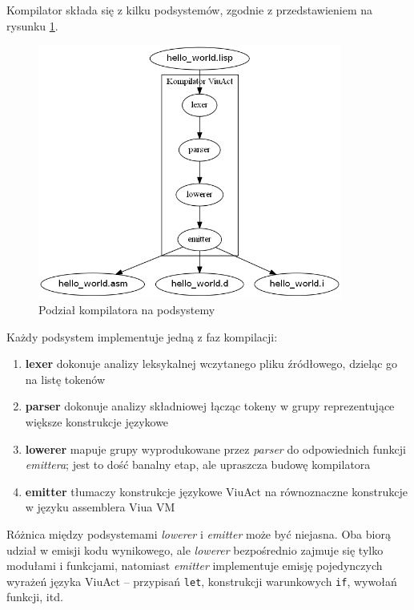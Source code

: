 \documentclass[11pt,oneside,a4paper,titlepage,onecolumn]{article}
\begin{document}
Kompilator składa się z kilku podsystemów, zgodnie z
przedstawieniem na rysunku \ref{ogolny_schemat_kompilatora_viuact}.

\begin{figure}[!htp]
    \centering
    \includegraphics[width=10cm]{viuact-ogolny-schemat-kompilatora}
    \caption{Podział kompilatora na podsystemy}
    \label{ogolny_schemat_kompilatora_viuact}
\end{figure}

Każdy podsystem implementuje jedną z faz kompilacji:

\begin{enumerate}
    \item \textbf{lexer} dokonuje analizy leksykalnej wczytanego pliku źródłowego, dzieląc go na listę tokenów
    \item \textbf{parser} dokonuje analizy składniowej łącząc tokeny w grupy reprezentujące większe
        konstrukcje językowe
    \item \textbf{lowerer} mapuje grupy wyprodukowane przez \emph{parser} do odpowiednich funkcji
        \emph{emittera}; jest to dość banalny etap, ale upraszcza budowę kompilatora
    \item \textbf{emitter} tłumaczy konstrukcje językowe ViuAct na równoznaczne konstrukcje w języku
        assemblera Viua VM
\end{enumerate}

Różnica między podsystemami \emph{lowerer} i \emph{emitter} może być niejasna. Oba biorą udział w emisji
kodu wynikowego, ale \emph{lowerer} bezpośrednio zajmuje się tylko modułami i funkcjami, natomiast
\emph{emitter} implementuje emisję pojedynczych wyrażeń języka ViuAct -- przypisań \texttt{let}, konstrukcji
warunkowych \texttt{if}, wywołań funkcji, itd.
\end{document}
